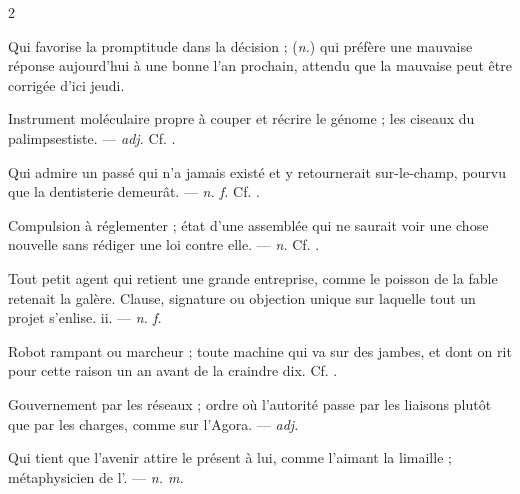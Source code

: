 \begin{multicols}{2}

 Qui favorise la promptitude dans la décision ; (\textit{n.}) qui préfère une mauvaise réponse aujourd'hui à une bonne l'an prochain, attendu que la mauvaise peut être corrigée d'ici jeudi.

 Instrument moléculaire propre à couper et récrire le génome ; les ciseaux du palimpsestiste.  —  \textit{adj.} Cf. .

 Qui admire un passé qui n'a jamais existé et y retournerait sur-le-champ, pourvu que la dentisterie demeurât. —  \textit{n. f.} Cf. .

 Compulsion à réglementer ; état d'une assemblée qui ne saurait voir une chose nouvelle sans rédiger une loi contre elle. —  \textit{n.} Cf. .

  Tout petit agent qui retient une grande entreprise, comme le poisson de la fable retenait la galère.   Clause, signature ou objection unique sur laquelle tout un projet s'enlise.   ii. —  \textit{n. f.}

 Robot rampant ou marcheur ; toute machine qui va sur des jambes, et dont on rit pour cette raison un an avant de la craindre dix. Cf. .

 Gouvernement par les réseaux ; ordre où l'autorité passe par les liaisons plutôt que par les charges, comme sur l'Agora. —  \textit{adj.}

 Qui tient que l'avenir attire le présent à lui, comme l'aimant la limaille ; métaphysicien de l'. —  \textit{n. m.}


\end{multicols}
